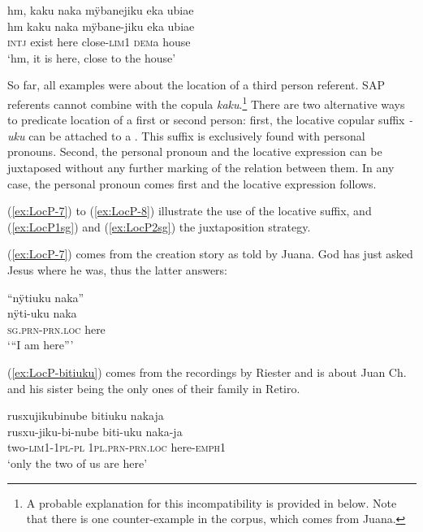 \ea\label{ex:LocP-6}
\begingl
\glpreamble hm, kaku naka mÿbanejiku eka ubiae\\
\gla hm kaku naka mÿbane-jiku eka ubiae\\
\glb \textsc{intj} exist here close-\textsc{lim}1 \textsc{dem}a house\\
\glft ‘hm, it is here, close to the house’
\endgl
\trailingcitation{[mtx-e110915ls.47]}
\xe

So far, all examples were about the location of a third person referent. SAP referents cannot combine with the copula \textit{kaku}.\footnote{A probable explanation for this incompatibility is provided in  below. Note that there is one counter-example in the corpus, which comes from Juana.} There are two alternative ways to predicate location of a first or second person: first, the locative copular suffix \textit{-uku} can be attached to a . This suffix is exclusively found with personal pronouns. Second, the personal pronoun and the locative expression can be juxtaposed without any further marking of the relation between them. In any case, the personal pronoun comes first and the locative expression follows.

(\ref{ex:LocP-7}) to (\ref{ex:LocP-8}) illustrate the use of the locative suffix, and (\ref{ex:LocP1sg}) and (\ref{ex:LocP2sg}) the juxtaposition strategy.

(\ref{ex:LocP-7}) comes from the creation story as told by Juana. God has just asked Jesus where he was, thus the latter answers:

\ea\label{ex:LocP-7}
\begingl
\glpreamble “nÿtiuku naka”\\
\gla nÿti-uku naka\\
\textsc{sg.prn}-\textsc{prn.loc} here\\
\glft ‘“I am here”’
\endgl
\trailingcitation{[jxx-n101013s-1.467]}
\xe

(\ref{ex:LocP-bitiuku}) comes from the recordings by Riester and is about Juan Ch. and his sister being the only ones of their family in Retiro.

\ea\label{ex:LocP-bitiuku}
\begingl 
\glpreamble rusxujikubinube bitiuku nakaja\\
\gla rusxu-jiku-bi-nube biti-uku naka-ja\\ 
\glb two-\textsc{lim}1-1\textsc{pl}-\textsc{pl} 1\textsc{pl.prn}-\textsc{prn.loc} here-\textsc{emph}1\\ 
\glft ‘only the two of us are here’\\ 
\endgl
\trailingcitation{[nxx-p630101g-1.165]}
\xe

